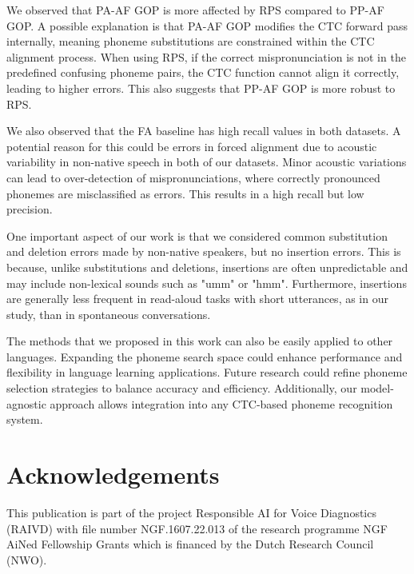 \documentclass{Interspeech}
\begin{document}
We observed that PA-AF GOP is more affected by RPS compared to PP-AF GOP. A possible explanation is that PA-AF GOP modifies the CTC forward pass internally, meaning phoneme substitutions are constrained within the CTC alignment process. When using RPS, if the correct mispronunciation is not in the predefined confusing phoneme pairs, the CTC function cannot align it correctly, leading to higher errors. This also suggests that PP-AF GOP is more robust to RPS.

We also observed that the FA baseline has high recall values in both datasets. A potential reason for this could be errors in forced alignment due to acoustic variability in non-native speech in both of our datasets. Minor acoustic variations can lead to over-detection of mispronunciations, where correctly pronounced phonemes are misclassified as errors. This results in a high recall but low precision.

One important aspect of our work is that we considered common substitution and deletion errors made by non-native speakers, but no insertion errors. This is because, unlike substitutions and deletions, insertions are often unpredictable and may include non-lexical sounds such as "umm" or "hmm". Furthermore, insertions are generally less frequent in read-aloud tasks with short utterances, as in our study, than in spontaneous conversations. %


The methods that we proposed in this work can also be easily applied to other languages. Expanding the phoneme search space could enhance performance and flexibility in language learning applications. Future research could refine phoneme selection strategies to balance accuracy and efficiency. Additionally, our model-agnostic approach allows integration into any CTC-based phoneme recognition system.




\section{Acknowledgements}
This publication is part of the project Responsible AI for Voice Diagnostics (RAIVD) with file number NGF.1607.22.013 of the research programme NGF AiNed Fellowship Grants which is financed by the Dutch Research Council (NWO).





\end{document}

